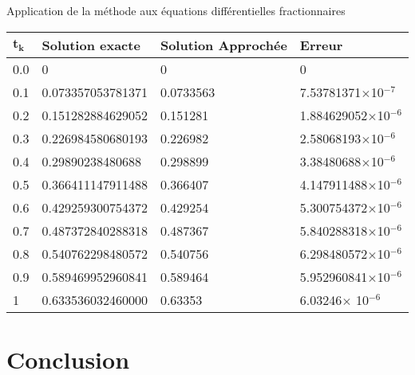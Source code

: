 \documentclass{sintefbeamer}
\begin{document}
\begin{frame}{Application de la méthode aux équations différentielles fractionnaires}
\begin{table}[H] \label{tab:2} 
\begin{tabular*}{\linewidth}{llll}
$\mathbf{t_k}$ & \textbf{Solution exacte} & \textbf{Solution Approchée} & \textbf{Erreur}    \\ 
\hline
0.0  &  0                  &  0                  &  0                \\
0.1  &  0.073357053781371  &  0.0733563  &  7.53781371$\times$10$^{-7}$\\
0.2  &  0.151282884629052  &  0.151281   &  1.884629052$\times$10$^{-6}$ \\
0.3  &  0.226984580680193  &  0.226982   &  2.58068193$\times$10$^{-6}$ \\
0.4  &  0.29890238480688   &  0.298899   &  3.38480688$\times$10$^{-6}$ \\
0.5  &  0.366411147911488  &  0.366407   &  4.147911488$\times$10$^{-6}$ \\
0.6  &  0.429259300754372  &  0.429254   &  5.300754372$\times$10$^{-6}$\\
0.7  &  0.487372840288318  &  0.487367   &  5.840288318$\times$10$^{-6}$\\
0.8  &  0.540762298480572  &  0.540756   &  6.298480572$\times$10$^{-6}$\\
0.9  &  0.589469952960841  &  0.589464   &  5.952960841$\times$10$^{-6}$\\
1    &  0.633536032460000  &  0.63353    &  6.03246$\times$ 10$^{-6}$\\
\hline
\end{tabular*}
\end{table}
\end{frame}

\section{Conclusion}
\end{document}
